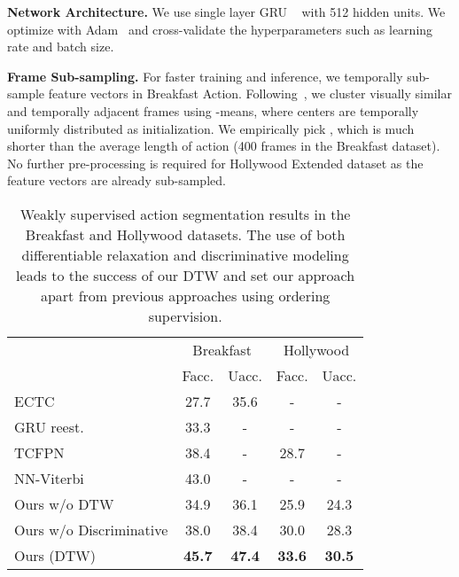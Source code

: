 \documentclass[10pt,twocolumn,letterpaper]{article}
\newcommand{\dttw}{DTW\xspace}
\begin{document}
\vspace{1mm}
{\noindent \bf Network Architecture.} We use single layer GRU ~\cite{graves2005framewise} with 512 hidden units. We optimize with Adam~\cite{kingma2014adam} and cross-validate the hyperparameters such as learning rate and batch size. 

\vspace{1mm}
{\noindent \bf Frame Sub-sampling.} For faster training and inference, we temporally sub-sample feature vectors in Breakfast Action. Following~\cite{huang2016connectionist}, we cluster visually similar and temporally adjacent frames using -means, where  centers are temporally uniformly distributed as initialization. We empirically pick , which is much shorter than the average length of action (400 frames in the Breakfast dataset). No further pre-processing is required for  Hollywood Extended dataset as the feature vectors are already sub-sampled.


\begin{table}
\small

\begin{center}
\begin{tabular}{lcccc}
\toprule
& \multicolumn{2}{c}{Breakfast} & \multicolumn{2}{c}{Hollywood} \\
 & Facc.  & Uacc. & Facc. & Uacc.\\
\midrule
ECTC\cite{huang2016connectionist} & 27.7 & 35.6 & - & -\\
GRU reest.\cite{richard2017weakly} & 33.3 & - & - & - \\
TCFPN\cite{ding2018weakly} & 38.4 & - & 28.7 & - \\
NN-Viterbi\cite{richard2018neuralnetwork} & 43.0 & - & - & - \\
\hline
Ours w/o DTW  & 34.9 & 36.1  &25.9 & 24.3 \\
Ours w/o Discriminative  & 38.0 & 38.4  & 30.0 & 28.3 \\
Ours (DTW) & {\bf 45.7} & {\bf 47.4} & {\bf 33.6} & {\bf 30.5}\\
\bottomrule
\end{tabular}
\end{center}
\caption{
Weakly supervised action segmentation results in the Breakfast and Hollywood datasets. The use of both differentiable relaxation and discriminative modeling leads to the success of our \dttw and set our approach apart from previous approaches using ordering supervision.}
\vspace{-3mm}
\label{tab:segmentation}
\end{table}
\end{document}
